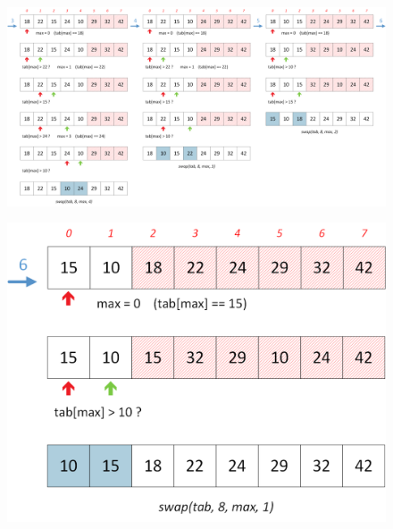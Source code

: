 \documentclass[11pt,a4paper]{article}
\begin{document}
\vfillLast

\clearpage

\vfillFirst

\begin{figure}[ht!]
\centering
\centerline{
\includegraphics[width=1.2\textwidth]{img/SelectionSort_part2_1.png}
}
\end{figure}

\begin{figure}[ht!]
\centering
\centerline{
\includegraphics[scale=0.5]{img/SelectionSort_part2_2.png}
}
\end{figure}
\end{document}
